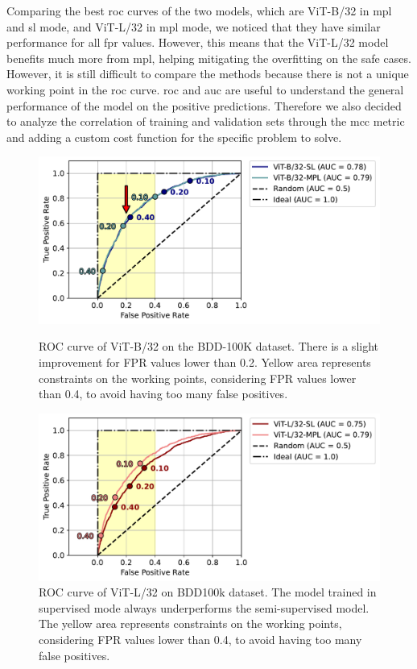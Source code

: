 Comparing the best \ac{roc} curves of the two models, which are ViT-B/32 in 
\acs{mpl} and \acs{sl} mode, and ViT-L/32 in \acs{mpl} mode, we noticed that 
they have similar performance for all \acs{fpr} values. However, this means that 
the ViT-L/32 model benefits much more from \acs{mpl}, helping mitigating the 
overfitting on the safe cases. However, it is still difficult to compare the 
methods because there is not a unique working point in the \ac{roc} curve. 
\acs{roc} and \acs{auc} are useful to understand the general performance of 
the model on the positive predictions. Therefore we also decided to analyze 
the correlation of training and validation sets through the \acf{mcc} metric and 
adding a custom cost function for the specific problem to solve.
\begin{figure}[p]
    \newpage
    \centering
    \includegraphics[width=\textwidth]{images/bdd100k/training/ViT-B32/roc-auc.pdf}
    \caption[ROC curve of ViT-B/32 on the BDD-100K dataset]
    {ROC curve of ViT-B/32 on the BDD-100K dataset. There is a slight improvement 
    for FPR values lower than 0.2. Yellow area represents constraints on the working 
    points, considering FPR values lower than 0.4, to avoid having too many false 
    positives.}
    \label{fig:roc_vitb32}
    \vspace{2cm}
    \includegraphics[width=\textwidth]{images/bdd100k/training/ViT-L32/roc-auc.pdf}
    \caption[ROC curve of ViT-L/32 on the BDD-100K dataset.]
    {ROC curve of ViT-L/32 on BDD100k dataset. The model trained in supervised 
    mode always underperforms the semi-supervised model.
    The yellow area represents constraints on the working points, considering 
    FPR values lower than 0.4, to avoid having too many false positives.}
    \label{fig:roc_vitl32}
\end{figure}

